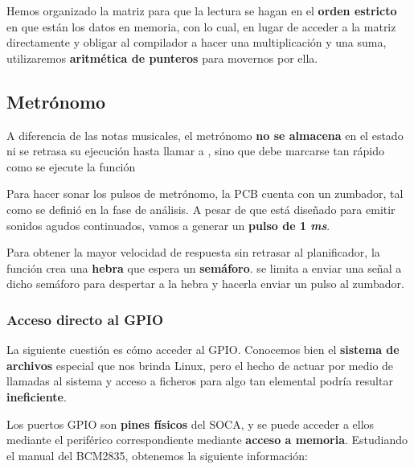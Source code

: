 Hemos organizado la matriz para que la lectura se hagan en el \textbf{orden estricto} en que están los datos en memoria, con lo cual, en lugar de acceder a la matriz directamente y obligar al compilador a hacer una multiplicación y una suma, utilizaremos \textbf{aritmética de punteros} para movernos por ella.

\subsection{Metrónomo}

A diferencia de las notas musicales, el metrónomo \textbf{no se almacena} en el estado ni se retrasa su ejecución hasta llamar a , sino que debe marcarse tan rápido como se ejecute la función 

Para hacer sonar los pulsos de metrónomo, la \acrshort{PCB} cuenta con un zumbador, tal como se definió en la fase de análisis. A pesar de que está diseñado para emitir sonidos agudos continuados, vamos a generar un \textbf{pulso de 1 \textit{ms}}.

Para obtener la mayor velocidad de respuesta sin retrasar al planificador, la función  crea una \textbf{hebra} que espera un \textbf{semáforo}.  se limita a enviar una señal a dicho semáforo para despertar a la hebra y hacerla enviar un pulso al zumbador.

\subsubsection{Acceso directo al GPIO}

La siguiente cuestión es cómo acceder al \acrshort{GPIO}. Conocemos bien el \textbf{sistema de archivos} especial que nos brinda Linux, pero el hecho de actuar por medio de llamadas al sistema y acceso a ficheros para algo tan elemental podría resultar \textbf{ineficiente}.

Los puertos \acrshort{GPIO} son \textbf{pines físicos} del \acrshort{SOCA}, y se puede acceder a ellos mediante el periférico correspondiente mediante \textbf{acceso a memoria}. Estudiando el manual del BCM2835, obtenemos la siguiente información:

\smallskip

